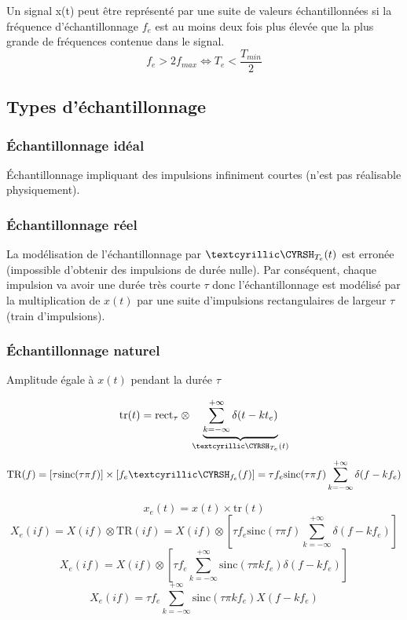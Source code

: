 \documentclass[a4paper,12pt]{report}
\begin{document}
\begin{defi}
    Un signal x(t) peut être représenté par une suite de valeurs échantillonnées si la fréquence d'échantillonnage $f_e$ est au moins deux fois plus élevée que la plus grande de fréquences contenue dans le signal.
    \[ f_e > 2f_{max} \Leftrightarrow T_e < \dfrac{T_{min}}{2} \]
\end{defi}

\subsection{Types d'échantillonnage}

\subsubsection{Échantillonnage idéal}

Échantillonnage impliquant des impulsions infiniment courtes (n'est pas réalisable physiquement).

\subsubsection{Échantillonnage réel}

La modélisation de l'échantillonnage par $\dirac_{T_e}(t)$ est erronée (impossible d'obtenir des impulsions de durée nulle). Par conséquent, chaque impulsion va avoir une durée très courte $\tau$ donc l'échantillonnage est modélisé par la multiplication de $x(t)$ par une suite d'impulsions rectangulaires de largeur $\tau$ (train d'impulsions).

\subsubsection{Échantillonnage naturel}

Amplitude égale à $x(t)$ pendant la durée $\tau$

\[ \mathrm{tr}(t) = \mathrm{rect}_\tau \otimes \underbrace{\sum_{k=-\infty}^{+\infty} \delta(t-kt_e)}_{\dirac_{T_e}(t)} \]
\[ \mathrm{TR}(f) = [\tau \mathrm{sinc}(\tau \pi f)] \times [f_e \dirac_{f_e}(f)] = \tau f_e \mathrm{sinc}(\tau \pi f) \sum_{k=-\infty}^{+\infty} \delta(f-kf_e) \]

\[ x_e(t) = x(t) \times \mathrm{tr}(t) \]
\[ X_e(if) = X(if) \otimes \mathrm{TR}(if) = X(if) \otimes [\tau f_e \mathrm{sinc}(\tau \pi f) \sum_{k=-\infty}^{+\infty} \delta(f-kf_e)] \]
\[ X_e(if) = X(if) \otimes [\tau f_e \sum_{k=-\infty}^{+\infty} \mathrm{sinc}(\tau \pi kf_e) \delta(f-kf_e)] \]
\[ X_e(if) = \tau f_e \sum_{k=-\infty}^{+\infty} \mathrm{sinc}(\tau \pi kf_e) X(f-kf_e) \]
\end{document}
